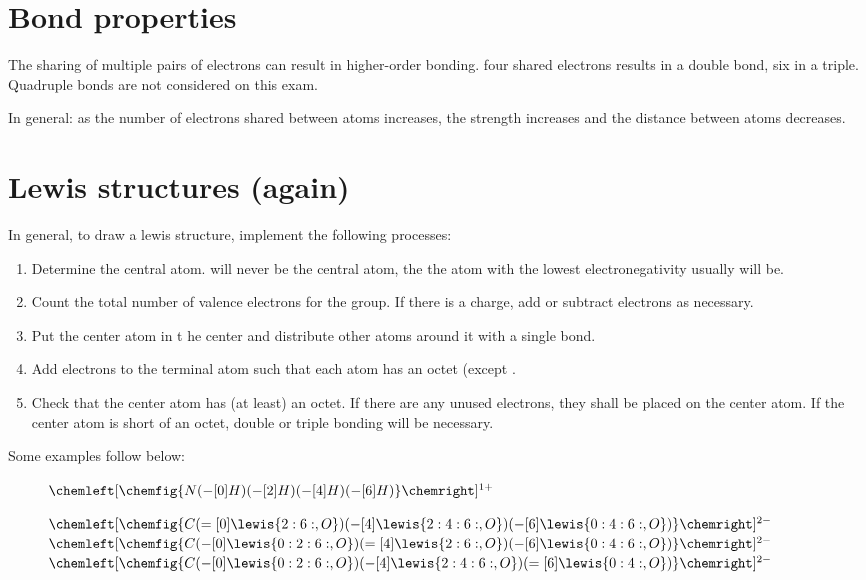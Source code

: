 \section{Bond properties}
The sharing of multiple pairs of electrons can result in higher-order bonding.
four shared electrons results in a double bond, six in a triple. Quadruple bonds
are not considered on this exam.

In general: as the number of electrons shared between atoms increases, the
strength increases and the distance between atoms decreases.

\section{Lewis structures (again)}
In general, to draw a lewis structure, implement the following processes:

\begin{enumerate}
  \item Determine the central atom.  will never be the central atom, the
    the atom with the lowest electronegativity usually will be.
  \item Count the total number of valence electrons for the group. If there is a
    charge, add or subtract electrons as necessary.
  \item Put the center atom in t he center and distribute other atoms around it
    with a single bond.
  \item Add electrons to the terminal atom such that each atom has an octet
    (except .
  \item Check that the center atom has (at least) an octet. If there are any
    unused electrons, they shall be placed on the center atom. If the center
    atom is short of an octet, double or triple bonding will be necessary.
\end{enumerate}

Some examples follow below:

\begin{description}
  \item[] 
  \item[]
    $\chemleft[\chemfig{N(-[0]H)(-[2]H)(-[4]H)(-[6]H)}\chemright]^{1+}$
  \item[]
    $\chemleft[\chemfig{C(=[0]\lewis{2:6:,O})(-[4]\lewis{2:4:6:,O})(-[6]\lewis{0:4:6:,O})}\chemright]^{2-}$
    $\chemleft[\chemfig{C(-[0]\lewis{0:2:6:,O})(=[4]\lewis{2:6:,O})(-[6]\lewis{0:4:6:,O})}\chemright]^{2-}$
    $\chemleft[\chemfig{C(-[0]\lewis{0:2:6:,O})(-[4]\lewis{2:4:6:,O})(=[6]\lewis{0:4:,O})}\chemright]^{2-}$
\end{description}

